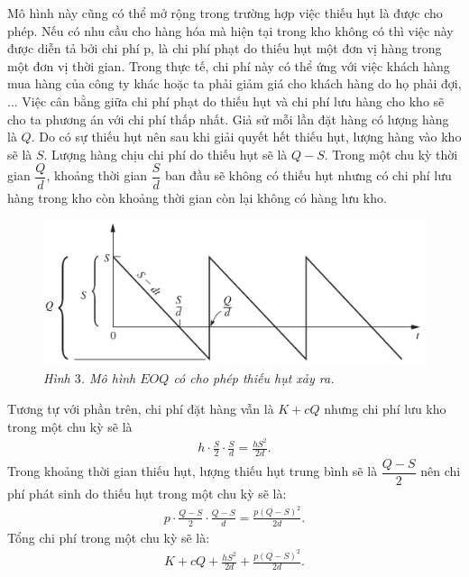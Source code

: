 \begin{multicols}{2}
	Mô hình này cũng có thể mở rộng trong trường hợp việc thiếu hụt là được cho phép. Nếu có nhu cầu cho hàng hóa mà hiện tại trong kho không có thì việc này được diễn tả bởi chi phí p, là chi phí phạt do thiếu hụt một đơn vị hàng trong một đơn vị thời gian. Trong thực tế, chi phí này có thể ứng với việc khách hàng mua hàng của công ty khác hoặc ta phải giảm giá cho khách hàng do họ phải đợi, ... Việc cân bằng giữa chi phí phạt do thiếu hụt và chi phí lưu hàng cho kho sẽ cho ta phương án với chi phí thấp nhất.
	\vskip 0.1cm
	Giả sử mỗi lần đặt hàng có lượng hàng là $Q$. Do có sự thiếu hụt nên sau khi giải quyết hết thiếu hụt, lượng hàng vào kho sẽ là $S$. Lượng hàng chịu chi phí do thiếu hụt sẽ là $Q-S$. Trong một chu kỳ thời gian $\dfrac{Q}{d}$, khoảng thời gian $\dfrac{S}{d}$ ban đầu sẽ không có thiếu hụt nhưng có chi phí lưu hàng trong kho còn khoảng thời gian còn lại không có hàng lưu kho.
	\begin{figure}[H]
		\vspace*{-5pt}
		\centering
		\captionsetup{labelformat= empty, justification=centering}
		\includegraphics[width= 1\linewidth]{4}
		\caption{\small\textit{\color{toanhocdoisong}Hình $3$. Mô hình $EOQ$ có cho phép thiếu hụt xảy ra.}}
		\vspace*{-10pt}
	\end{figure}
	Tương tự với phần trên, chi phí đặt hàng vẫn là $K+cQ$ nhưng chi phí lưu kho trong một chu kỳ sẽ là
	\begin{align*}
		h\cdot\frac{S}{2}\cdot\frac{S}{d} = \frac{hS^2}{2d}.
	\end{align*}
	Trong khoảng thời gian thiếu hụt, lượng thiếu hụt trung bình sẽ là $\dfrac{Q-S}{2}$ nên chi phí phát sinh do thiếu hụt trong một chu kỳ sẽ là:
	\begin{align*}
		p\cdot\frac{Q-S}{2}\cdot\frac{Q-S}{d} = \frac{p(Q-S)^2}{2d}.
	\end{align*}
	Tổng chi phí trong một chu kỳ sẽ là:
	\begin{align*}
		K + cQ + \frac{hS^2}{2d} + \frac{p(Q-S)^2}{2d}.
	\end{align*}

\end{multicols}
